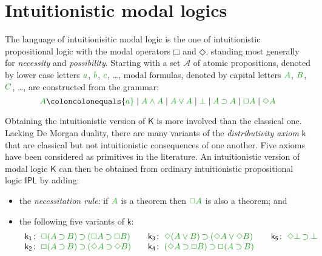 \documentclass[a4paper]{article}
\theoremstyle{plain}
\theoremstyle{definition}
\newcommand*{\ax}[1]{\mathsf{#1}}
\newcommand*{\kax}[1][]{\ax{k_{#1}}}
\newcommand*{\K}{\mathsf{K}}
\newcommand*{\AND}{\mathbin{\wedge}}
\newcommand*{\OR}{\mathbin{\vee}}
\newcommand*{\BOT}{\mathord{\bot}}
\newcommand*{\IMP}{\mathbin{\supset}}%
\newcommand*{\BOX}{\mathord{\Box}}
\newcommand*{\DIA}{\mathord{\Diamond}}
\newcommand*{\fm}[1]{{\color{notgreen}{#1}}}
\newcommand*{\rn}[1]  {\ensuremath{\mathsf{#1}}}
\begin{document}
 \section{Intuitionistic modal logics}\label{sec:intmod}
 
 
 The language of {intuitionisitic modal logic} is the one of intuitionistic propositional logic with the modal operators $\BOX$ and $\DIA$, standing most generally for \emph{necessity} and \emph{possibility}.
 Starting with a set $\mathcal{A}$ of atomic propositions, denoted by lower case letters $\fm a$, $\fm b$, $\fm c$, \ldots, modal formulas, denoted by capital letters $\fm A$, $\fm B$, $\fm C$, \ldots, are constructed from the grammar:
 $$
 \fm A \coloncolonequals
 \fm a \mid \fm{A \AND A} \mid \fm{A \OR A} \mid \fm \BOT \mid \fm{A \IMP A} \mid \fm{\BOX A} \mid \fm{\DIA A}
 $$
 
 Obtaining the intuitionistic version of $\mathsf{K}$ is more involved than the classical one. 
 Lacking De Morgan duality, there are many variants of the \emph{distributivity axiom} $\mathsf{k}$ that are classical but not intuitionistic consequences of one another. Five axioms have been considered as primitives in the literature. An intuitionistic version of modal logic $\K$ can then be obtained from ordinary intuitionistic propositional logic $\rn{IPL}$ by adding:
 
 \begin{itemize}
 	\item the \emph{necessitation rule}: if $\fm A$ is a theorem then $\fm{\BOX A}$ is also a theorem; and
 	\item the following five variants of $\rn{k}$:
 	\begin{equation*}
 		\label{eq:ik}%
 		\begin{array}[t]{r@{\;}l@{\qquad}r@{\;}l@{\qquad}r@{\;}l}
 			\kax[1]\colon&\fm{\BOX(A\IMP B)\IMP(\BOX A\IMP\BOX B)}
 			&
 			\kax[3]\colon&\fm{\DIA(A\OR B)\IMP(\DIA A\OR\DIA B)}
 			&
 			\kax[5]\colon&\fm{\DIA\BOT\IMP\BOT}
 			\\
 			\kax[2]\colon&\fm{\BOX(A\IMP B)\IMP(\DIA A\IMP\DIA B)}
 			&
 			\kax[4]\colon&\fm{(\DIA A\IMP \BOX B)\IMP\BOX(A\IMP B)}\\%
 		\end{array}
 	\end{equation*}
 \end{itemize}
 
\end{document}

